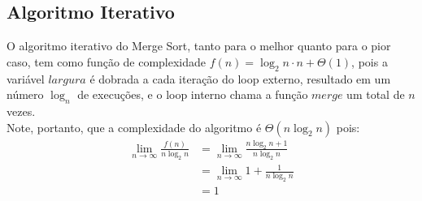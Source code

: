\subsection{Algoritmo Iterativo}
O algoritmo iterativo do Merge Sort, tanto para o melhor quanto para o pior caso, tem como função de complexidade $f(n) = \log_2 n \cdot n + \Theta(1)$, pois a variável $largura$ é dobrada a cada iteração do loop externo, resultado em um número $\log_n$ de execuções, e o loop interno chama a função $merge$ um total de $n$ vezes. \\
Note, portanto, que a complexidade do algoritmo é $\Theta(n \log_2 n)$ pois:
\begin{align*}
  \lim_{n\to\infty} \frac{f(n)}{n\log_2 n} &= \lim_{n\to\infty} \frac{n \log_2 n + 1}{n\log_2 n} \\
  &= \lim_{n\to\infty} 1 + \frac{1}{n \log_2 n} \\
  &= 1
\end{align*}
